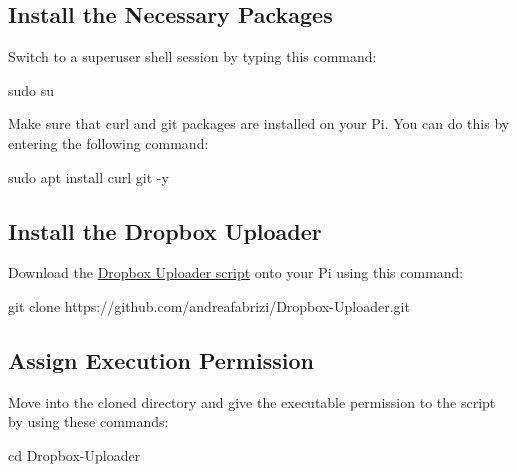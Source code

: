\documentclass[
  letterpaper,
]{scrbook}
\newenvironment{Shaded}{\begin{snugshade}}{\end{snugshade}}
\newcommand{\AttributeTok}[1]{\textcolor[rgb]{0.40,0.45,0.13}{#1}}
\newcommand{\BuiltInTok}[1]{\textcolor[rgb]{0.00,0.23,0.31}{#1}}
\newcommand{\FunctionTok}[1]{\textcolor[rgb]{0.28,0.35,0.67}{#1}}
\newcommand{\NormalTok}[1]{\textcolor[rgb]{0.00,0.23,0.31}{#1}}
\begin{document}
\subsection{Install the Necessary
Packages}\label{install-the-necessary-packages}

Switch to a superuser shell session by typing this command:

\begin{Shaded}
\begin{Highlighting}[]
\FunctionTok{sudo}\NormalTok{ su}
\end{Highlighting}
\end{Shaded}

Make sure that curl and git packages are installed on your Pi. You can
do this by entering the following command:

\begin{Shaded}
\begin{Highlighting}[]
\FunctionTok{sudo}\NormalTok{ apt install curl git }\AttributeTok{{-}y}
\end{Highlighting}
\end{Shaded}

\subsection{Install the Dropbox
Uploader}\label{install-the-dropbox-uploader}

Download the
\href{https://github.com/andreafabrizi/Dropbox-Uploader/}{Dropbox
Uploader script} onto your Pi using this command:

\begin{Shaded}
\begin{Highlighting}[]
\FunctionTok{git}\NormalTok{ clone https://github.com/andreafabrizi/Dropbox{-}Uploader.git}
\end{Highlighting}
\end{Shaded}

\subsection{Assign Execution
Permission}\label{assign-execution-permission}

Move into the cloned directory and give the executable permission to the
script by using these commands:

\begin{Shaded}
\begin{Highlighting}[]
\BuiltInTok{cd}\NormalTok{ Dropbox{-}Uploader}
\end{Highlighting}
\end{Shaded}
\end{document}

